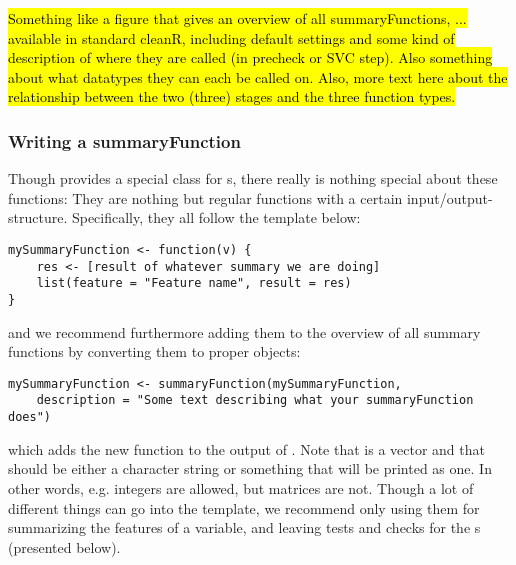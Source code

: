 \documentclass[article]{jss}
\begin{document}
\hl{Something like a figure that gives an overview of all summaryFunctions, ... available in standard cleanR, including default settings and some kind of description of where they are called (in precheck or SVC step). Also something about what datatypes they can each be called on. Also, more text here about the relationship between the two (three) stages and the three function types.}


\subsubsection{Writing a summaryFunction}
Though  provides a special class for s, there really is nothing special about these functions: They are nothing but regular functions with a certain input/output-structure. Specifically, they all follow the template below:
\begin{Verbatim}
mySummaryFunction <- function(v) {
	res <- [result of whatever summary we are doing]
	list(feature = "Feature name", result = res)
}
\end{Verbatim}
and we recommend furthermore adding them to the overview of all summary functions by converting them to proper  objects:
\begin{Verbatim}
mySummaryFunction <- summaryFunction(mySummaryFunction,
	description = "Some text describing what your summaryFunction does")
\end{Verbatim}
which adds the new function to the output of . Note that  is a vector and that  should be either a character string or something that will be printed as one. In other words, e.g. integers are allowed, but matrices are not. Though a lot of different things can go into the  template, we recommend only using them for summarizing the features of a variable, and leaving tests and checks for the s (presented below).
\end{document}
